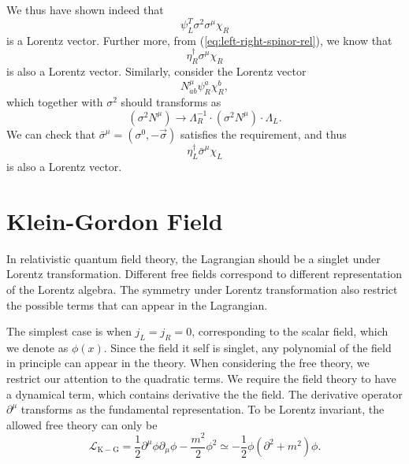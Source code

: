 We thus have shown indeed that
\begin{equation}
	\psi_L^T \sigma^2 \sigma^\mu \chi_R
\end{equation}
is a Lorentz vector.
Further more, from (\ref{eq:left-right-spinor-rel}), we know that
\begin{equation}
	\eta_R^\dagger \sigma^\mu \chi_R
\end{equation}
is also a Lorentz vector.
Similarly, consider the Lorentz vector 
\begin{equation*}
	N^\mu_{\dot a b} \psi^{\dot a}_R \chi^{b}_R,
\end{equation*}
which together with $\sigma^2$ should transforms as
\begin{equation*}
	\left(\sigma^2 N^\mu\right) \longrightarrow 
	\Lambda_R^{-1} \cdot \left(\sigma^2 N^\mu\right)\cdot \Lambda_L.
\end{equation*}
We can check that $\bar\sigma^\mu = (\sigma^0,-\vec\sigma)$ satisfies the requirement, and thus 
\begin{equation}
	\eta_L^\dagger \bar\sigma^\mu \chi_L
\end{equation}
is also a Lorentz vector.


\section{Klein-Gordon Field}

In relativistic quantum field theory, the Lagrangian should be a singlet under Lorentz transformation.
Different free fields correspond to different representation of the Lorentz algebra.
The symmetry under Lorentz transformation also restrict the possible terms that can appear in the Lagrangian.


The simplest case is when $j_L=j_R = 0$, corresponding to the scalar field, which we denote as $\phi(x)$.
Since the field it self is singlet, any polynomial of the field in principle can appear in the theory.
When considering the free theory, we restrict our attention to the quadratic terms.
We require the field theory to have a dynamical term, which contains derivative the the field.
The derivative operator $\partial^\mu$ transforms as the fundamental representation.
To be Lorentz invariant, the allowed free theory can only be
\begin{equation}
	\mathcal L_{\mathrm{K-G}} = \frac{1}{2}\partial^\mu \phi \partial_\mu \phi -\frac{m^2}{2}\phi^2 
	\simeq -\frac{1}{2}\phi (\partial^2+m^2) \phi.
\end{equation}



